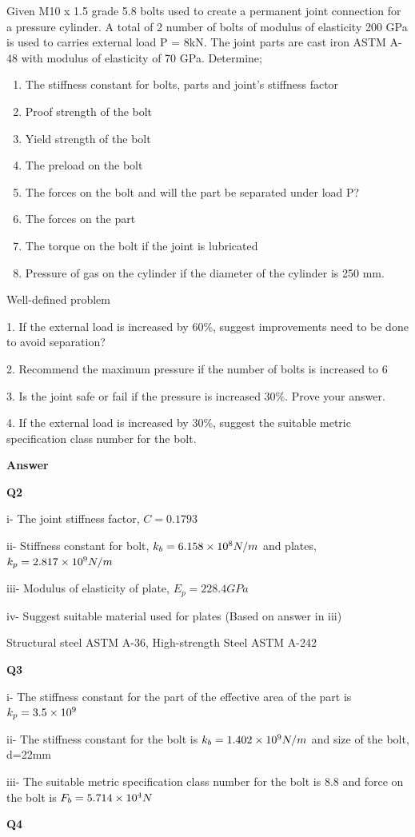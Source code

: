 \documentclass[a4paper, fleqn]{article}
\providecommand{\sci}[1]{\protect\ensuremath{\times 10^{\StrSubstitute[0]{#1}{e}{}}}}
\begin{document}
Given M10 x 1.5 grade 5.8 bolts used to create a permanent joint connection for a pressure cylinder. A total of 2 number of bolts of modulus of elasticity 200 GPa is used to carries external load P = 8kN. The joint parts are cast iron ASTM A-48 with modulus of elasticity of 70 GPa. Determine;

\begin{enumerate}[label=(\roman*)]
    \item The stiffness constant for bolts, parts and joint’s stiffness factor
    \item Proof strength of the bolt
    \item Yield strength of the bolt
    \item The preload on the bolt
    \item The forces on the bolt and will the part be separated under load P?
    \item The forces on the part
    \item The torque on the bolt if the joint is lubricated
    \item Pressure of gas on the cylinder if the diameter of the cylinder is 250 mm.

\end{enumerate}

Well-defined problem

1. If the external load is increased by 60\%, suggest improvements need to be done to avoid separation?

2. Recommend the maximum pressure if the number of bolts is increased to 6

3. Is the joint safe or fail if the pressure is increased 30\%. Prove your answer.

4. If the external load is increased by 30\%, suggest the suitable metric specification class number for the bolt.


\newpage

\textbf{Answer}
\vspace{10pt}

\textbf{Q2}

i- The joint stiffness factor, $C=0.1793$

ii- Stiffness constant for bolt, $k_b=6.158\sci{e8}N/m$ and plates, $k_p=2.817\sci{e9}N/m$

iii- Modulus of elasticity of plate, $E_p=228.4GPa$

iv- Suggest suitable material used for plates (Based on answer in iii)

Structural steel ASTM A-36, High-strength Steel ASTM A-242

\vspace{10pt}
\textbf{Q3}

i- The stiffness constant for the part of the effective area of the part is $k_p=3.5\sci{e9}$

ii- The stiffness constant for the bolt is $k_b=1.402\sci{e9}N/m$ and size of the bolt, d=22mm

iii- The suitable metric specification class number for the bolt is 8.8 and force on the bolt is $F_b=5.714\sci{e4}N$

\vspace{10pt}
\textbf{Q4}
\end{document}
